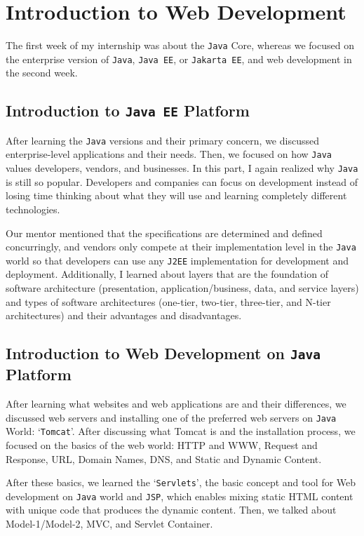 \section{Introduction to Web Development}

The first week of my internship was about the \texttt{Java} Core, whereas we focused on the enterprise version of \texttt{Java}, \texttt{Java EE}, or \texttt{Jakarta EE}, and web development in the second week.

\subsection{Introduction to \texttt{Java EE} Platform}

After learning the \texttt{Java} versions and their primary concern, we discussed enterprise-level applications and their needs. Then, we focused on how \texttt{Java} values developers, vendors, and businesses. In this part, I again realized why \texttt{Java} is still so popular. Developers and companies can focus on development instead of losing time thinking about what they will use and learning completely different technologies.

Our mentor mentioned that the specifications are determined and defined concurringly, and vendors only compete at their implementation level in the \texttt{Java} world so that developers can use any \texttt{J2EE} implementation for development and deployment. Additionally, I learned about layers that are the foundation of software architecture (presentation, application/business, data, and service layers) and types of software architectures (one-tier, two-tier, three-tier, and N-tier architectures) and their advantages and disadvantages.

\subsection{Introduction to Web Development on \texttt{Java} Platform}

After learning what websites and web applications are and their differences, we discussed web servers and installing one of the preferred web servers on \texttt{Java} World: `\texttt{Tomcat}'. After discussing what Tomcat is and the installation process, we focused on the basics of the web world: HTTP and WWW, Request and Response, URL, Domain Names, DNS, and Static and Dynamic Content.

After these basics, we learned the `\texttt{Servlets}', the basic concept and tool for Web development on \texttt{Java} world and \texttt{JSP}, which enables mixing static HTML content with unique code that produces the dynamic content. Then, we talked about Model-1/Model-2, MVC, and Servlet Container.

